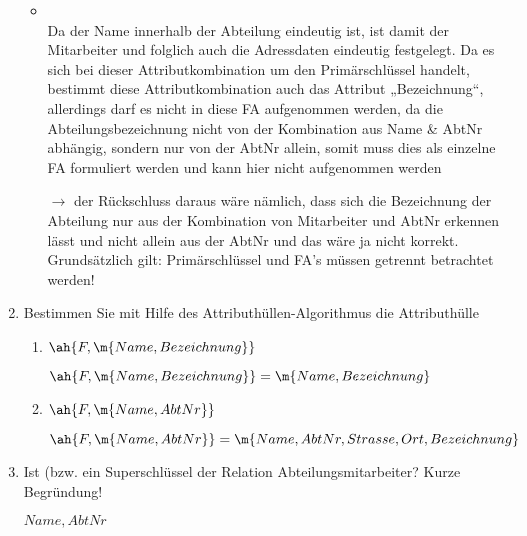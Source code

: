 \documentclass{lehramt-informatik-aufgabe}
\begin{document}
\begin{enumerate}
\begin{liAntwort}
\begin{itemize}
\item {} \\
Da der Name innerhalb der Abteilung eindeutig ist, ist damit der
Mitarbeiter und folglich auch die Adressdaten eindeutig festgelegt. Da
es sich bei dieser Attributkombination um den Primärschlüssel handelt,
bestimmt diese Attributkombination auch das Attribut „Bezeichnung“,
allerdings darf es nicht in diese FA aufgenommen werden, da die
Abteilungsbezeichnung nicht von der Kombination aus Name \& AbtNr
abhängig, sondern nur von der AbtNr allein, somit muss dies als
einzelne FA formuliert werden und kann hier nicht aufgenommen werden

$\rightarrow$ der Rückschluss daraus wäre nämlich, dass sich die
Bezeichnung der Abteilung nur aus der Kombination von Mitarbeiter und
AbtNr erkennen lässt und nicht allein aus der AbtNr und das wäre ja
nicht korrekt. Grundsätzlich gilt: Primärschlüssel und FA’s müssen
getrennt betrachtet werden!

\end{itemize}

\end{liAntwort}


\item Bestimmen Sie \zB mit Hilfe des Attributhüllen-Algorithmus die
Attributhülle

\begin{enumerate}


\item $\ah{F, \m{Name, Bezeichnung}}$

\begin{liAntwort}
$\ah{F, \m{Name, Bezeichnung}} = \m{Name, Bezeichnung}$
\end{liAntwort}


\item $\ah{F, \m{Name, AbtNr}}$

\begin{liAntwort}
$\ah{F, \m{Name, AbtNr}} = \m{Name, AbtNr, Strasse, Ort, Bezeichnung}$
\end{liAntwort}
\end{enumerate}


\item Ist  (bzw.  ein Superschlüssel
der Relation Abteilungsmitarbeiter? Kurze Begründung!

\begin{liAntwort}
${Name, AbtNr}$
\end{liAntwort}

\end{enumerate}
\end{document}
